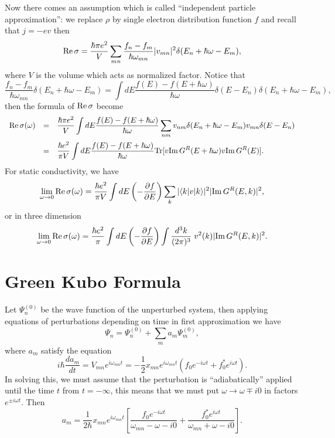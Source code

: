 \documentclass{book}
\newcommand{\bra}[1]{{\langle#1|}}
\newcommand{\ket}[1]{{|#1\rangle}}
\renewcommand{\Re}{{\rm Re}}
\renewcommand{\Im}{{\rm Im}}
\newcommand{\Tr}{{\rm Tr}}
\numberwithin{equation}{section}
\begin{document}
Now there comes an assumption which is called ``independent particle
approximation'': we replace $\rho$ by single electron distribution
function $f$ and recall that $j=-ev$ then
\begin{equation}
  \Re\,\sigma=\frac{\hbar\pi e^2}{V}\sum_{mn}
  \frac{f_n-f_m}{\hbar\omega_{mn}}|v_{mn}|^2\delta(E_n+\hbar\omega-E_m),
\end{equation}
where $V$ is the volume which acts as normalized factor.
Notice that 
\begin{equation}
  \frac{f_n-f_m}{\hbar\omega_{mn}}\delta(E_n+\hbar\omega-E_m)=
  \int dE\frac{f(E)-f(E+\hbar\omega)}{\hbar\omega}
  \delta(E-E_n)\delta(E_n+\hbar\omega-E_m),
\end{equation}
then the formula of $\Re\,\sigma$ become
\begin{equation}
  \begin{array}{rcl}
    \Re\,\sigma(\omega)&=&\displaystyle\frac{\hbar\pi e^2}{V} \int
    dE\frac{f(E)-f(E+\hbar\omega)}{\hbar\omega}\sum_{nm}
    v_{nm}\delta(E_n+\hbar\omega-E_m)v_{mn}\delta(E-E_n)\\\vbox to
    20pt{} &=&\displaystyle\frac{\hbar e^2}{\pi V}\int dE
    \frac{f(E)-f(E+\hbar\omega)}{\hbar\omega}
    \Tr[v\Im\,G^R(E+\hbar\omega)v\Im\,G^R(E)].
  \end{array}
\end{equation}
For static conductivity, we have
\begin{equation}
  \lim_{\omega\to0}\Re\,\sigma(\omega)=
  \frac{\hbar e^2}{\pi V}\int dE
  \left(-\frac{\partial f}{\partial E}\right)
  \sum_k|\bra{k}v\ket{k}|^2|\Im\,G^R(E,k)|^2,
\end{equation}
or in three dimension
\begin{equation}
  \lim_{\omega\to0}\Re\,\sigma(\omega)=
  \frac{\hbar e^2}{\pi}\int dE
  \left(-\frac{\partial f}{\partial E}\right)
  \int \frac{d^3k}{(2\pi)^3}\; v^2(k)|\Im\,G^R(E,k)|^2.
\end{equation}

\section{Green Kubo Formula}
Let $\Psi^{(0)}_n$ be the wave function of the unperturbed system,
then applying equations of perturbations depending on time in first
approximation we have
\begin{equation}
  \Psi_n=\Psi^{(0)}_n+\sum_ma_{m}\Psi^{(0)}_m,
\end{equation}
where $a_m$ satisfy the equation
\begin{equation}
  i\hbar\frac{da_m}{dt}=V_{mn}e^{i\omega_{mn}t}=-\frac{1}{2}
  x_{mn}e^{i\omega_{mn}t}(f_0e^{-i\omega t}+f_0^*e^{i\omega t}).
\end{equation}
In solving this, we must assume that the perturbation is ``adiabatically''
applied until the time $t$ from $t=-\infty$, this means that we must put
$\omega\to\omega\mp i0$ in factors $e^{\pm i\omega t}$. Then
\begin{equation}
  a_m=\frac{1}{2\hbar}x_{mn}e^{i\omega_{mn}t}\left[
    \frac{f_0e^{-i\omega t}}{\omega_{mn}-\omega-i0}+
    \frac{f_0^*e^{i\omega t}}{\omega_{mn}+\omega-i0}\right].
\end{equation}
\end{document}
